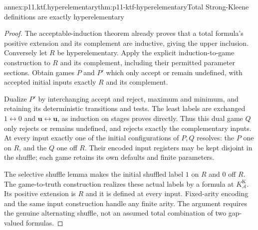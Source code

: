 \begin{annexitem}{annex:p11.ktf.hyperelementary}{thm:p11-ktf-hyperelementary}{Total Strong-Kleene definitions are exactly hyperelementary}
\begin{proof}
The acceptable-induction theorem already proves that a total formula's
positive extension and its complement are inductive, giving the
upper inclusion. Conversely let \(R\) be hyperelementary.
Apply the explicit induction-to-game construction to \(R\)
and its complement, including their permitted parameter sections.
Obtain games \(P\) and \(P'\) which only accept or remain
undefined, with accepted initial inputs exactly \(R\) and
its complement.

Dualize \(P'\) by interchanging accept and reject, maximum
and minimum, and retaining its deterministic transitions and tests.
The least labels are exchanged \(1\leftrightarrow0\) and
\(\mathbf u\leftrightarrow\mathbf u\), as induction on
stages proves directly. Thus this dual game \(Q\) only
rejects or remains undefined, and rejects exactly the complementary
inputs. At every input exactly one of the initial configurations
of \(P,Q\) resolves: the \(P\) one on \(R\), and the
\(Q\) one off \(R\). Their encoded input registers may
be kept disjoint in the shuffle; each game retains its own defaults
and finite parameters.

The selective shuffle lemma makes the initial shuffled label \(1\)
on \(R\) and \(0\) off \(R\). The game-to-truth
construction realizes these actual labels by a formula at
\(K_{\mathcal A}^{\mathrm K}\). Its positive extension
is \(R\) and it is defined at every input. Fixed-arity encoding
and the same input construction handle any finite arity. The argument
requires the genuine alternating shuffle, not an assumed total
combination of two gap-valued formulas.
\end{proof}
\end{annexitem}

